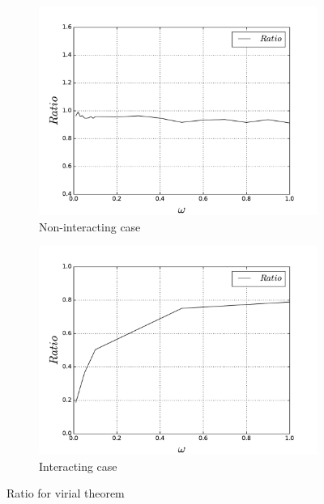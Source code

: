 \documentclass[10pt]{article}
\begin{document}
\begin{figure}[h!] 
  \begin{subfigure}[b]{0.6\linewidth}
    \centering
    \includegraphics[width=1.1\linewidth]{Ratio_non_ineracting} 
    \caption{Non-interacting case} 
    \label{fig2:a} 
    \vspace{1ex}
  \end{subfigure}%
  \begin{subfigure}[b]{0.6\linewidth}
    \centering
    \includegraphics[width=1.1\linewidth]{ratio_on_omega_ineraction} 
    \caption{Interacting case} 
    \label{fig2:b} 
    \vspace{1ex}
  \end{subfigure} 
  \caption{Ratio for virial theorem }
  \label{fig2} 
\end{figure}
\end{document}
